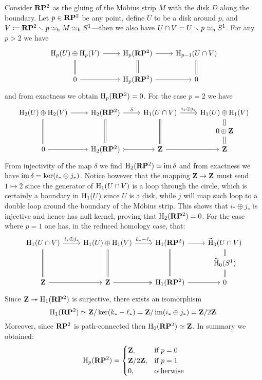 \begin{example}
\label{exp:rp2-homology}
Consider \(\mathbf{R} \mathbf{P}^2\) as the gluing of the M\"{o}bius strip \(M\) with the
disk \(D\) along the boundary. Let \(p \in \mathbf{R} \mathbf{P}^2\) be any point, define
\(U\) to be a disk around \(p\), and \(V \coloneq \mathbf{R} \mathbf{P}^2 \smallsetminus p \simeq_{\text{h}} M \simeq_{\text{h}}
S^1\)---then we also have \(U \cap V = U \smallsetminus p \simeq_{\text{h}} S^1\). For any \(p > 2\) we have
\[
\begin{tikzcd}
\Hmlg_p(U) \oplus \Hmlg_p(V) \ar[r] \ar[d, equals]
&\Hmlg_p(\R \Proj^2) \ar[r] \ar[d, equals]
&\Hmlg_{p-1}(U \cap V) \ar[d, equals]
\\
0 \ar[r]
&\Hmlg_p(\R \Proj^2) \ar[r]
&0
\end{tikzcd}
\]
and from exactness we obtain \(\operatorname{H}_p(\mathbf{R}\mathbf{P}^2) = 0\). For the case \(p = 2\)
we have
\[
\begin{tikzcd}[row sep=small]
\Hmlg_2(U) \oplus \Hmlg_2(V) \ar[r] \ar[dd, equals]
&\Hmlg_2(\R\Proj^2) \ar[r, "\delta"] \ar[dd, equals]
&\Hmlg_1(U \cap V) \ar[dd, equals] \ar[r, "i_* \oplus j_{*}"]
&\Hmlg_1(U) \oplus \Hmlg_1(V) \ar[d, equals]
\\
&&&0 \oplus \Z \ar[d, equals]
\\
0 \ar[r]
&\Hmlg_2(\R\Proj^2) \ar[r, tail]
&\Z \ar[r]
&\Z
\end{tikzcd}
\]
From injectivity of the map \(\delta\) we find
\(\operatorname{H}_2(\mathbf{R}\mathbf{P}^2) \simeq \operatorname{im} \delta\) and from exactness we have
\(\operatorname{im} \delta = \ker(i_{*} \oplus j_{*})\). Notice however that the mapping
\(\mathbf{Z} \to \mathbf{Z}\) must send \(1 \mapsto 2\) since the generator of
\(\operatorname{H}_1(U \cap V)\) is a loop through the circle, which is certainly a boundary
in \(\operatorname{H}_1(U)\) since \(U\) is a disk, while \(j\) will map such loop to a
double loop around the boundary of the M\"{o}bius strip. This shows that
\(i_{*} \oplus j_{*}\) is injective and hence has null kernel, proving that
\(\operatorname{H}_2(\mathbf{R}\mathbf{P}^2) = 0\). For the case where \(p = 1\) one has, in the reduced
homology case, that:
\[
\begin{tikzcd}[row sep=small]
\Hmlg_1(U \cap V) \ar[r, "i_{*} \oplus j_{*}"] \ar[dd, equals]
&\Hmlg_1(U) \oplus \Hmlg_1(V) \ar[r, "k_{*} - \ell_{*}"] \ar[dd, equals]
&\Hmlg_1(\R\Proj^2) \ar[r] \ar[dd, equals]
&\rHmlg_0(U \cap V) \ar[d, equals]
\\
&&&\rHmlg_0(S^1) \ar[d, equals]
\\
\Z \ar[r] &\Z \ar[r, two heads] &\Hmlg_1(\R\Proj^2) \ar[r] &0
\end{tikzcd}
\]
Since \(\mathbf{Z} \twoheadrightarrow \operatorname{H}_1(\mathbf{R}\mathbf{P}^2)\) is surjective, there exists an isomorphism
\[
\operatorname{H}_1(\mathbf{R}\mathbf{P}^2) \simeq \mathbf{Z}/\ker(k_{*} - \ell_{*}) = \mathbf{Z}/\operatorname{im}(i_{*} \oplus j_{*}) = \mathbf{Z}/2\mathbf{Z}.
\]
Moreover, since \(\mathbf{R}\mathbf{P}^2\) is path-connected then
\(\operatorname{H}_0(\mathbf{R}\mathbf{P}^2) \simeq \mathbf{Z}\). In summary we obtained:
\[
\operatorname{H}_p(\mathbf{R} \mathbf{P}^2) =
\begin{cases}
  \mathbf{Z}, &\text{if } p = 0 \\
  \mathbf{Z}/2\mathbf{Z}, &\text{if } p = 1 \\
  0, &\text{otherwise}
\end{cases}
\]
\end{example}

